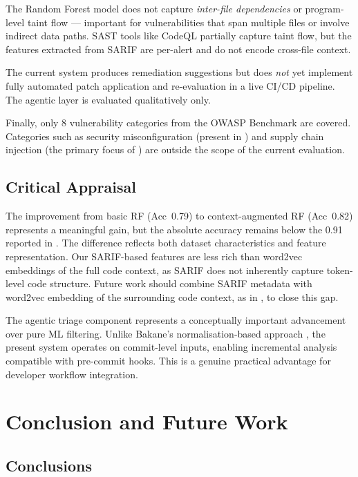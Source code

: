 \documentclass[conference]{IEEEtran}
\begin{document}
The Random Forest model does not capture \emph{inter-file dependencies} or
program-level taint flow --- important for vulnerabilities that span multiple
files or involve indirect data paths. SAST tools like CodeQL partially capture
taint flow, but the features extracted from SARIF are per-alert and do not
encode cross-file context.

The current system produces remediation suggestions but does \emph{not} yet
implement fully automated patch application and re-evaluation in a live CI/CD
pipeline. The agentic layer is evaluated qualitatively only.

Finally, only 8 vulnerability categories from the OWASP Benchmark are covered.
Categories such as security misconfiguration (present in \cite{syed2025agentic})
and supply chain injection (the primary focus of \cite{syed2025agentic}) are
outside the scope of the current evaluation.

\subsection{Critical Appraisal}

The improvement from basic RF (Acc~0.79) to context-augmented RF (Acc~0.82)
represents a meaningful gain, but the absolute accuracy remains below the 0.91
reported in \cite{hegedus2022sca}. The difference reflects both dataset
characteristics and feature representation. Our SARIF-based features are less
rich than word2vec embeddings of the full code context, as SARIF does not
inherently capture token-level code structure. Future work should combine SARIF
metadata with word2vec embedding of the surrounding code context, as
in \cite{hegedus2022sca}, to close this gap.

The agentic triage component represents a conceptually important advancement over
pure ML filtering. Unlike Bakane's normalisation-based approach
\cite{bakane2025thesis}, the present system operates on commit-level inputs,
enabling incremental analysis compatible with pre-commit hooks. This is a genuine
practical advantage for developer workflow integration.

\section{Conclusion and Future Work}
\label{sec:conclusion}

\subsection{Conclusions}
\end{document}
